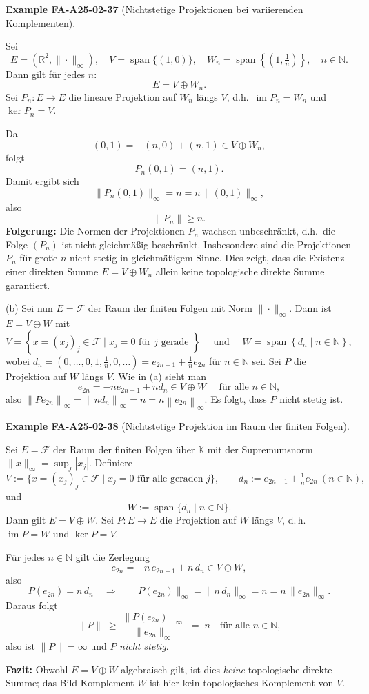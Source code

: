 \documentclass[10pt, letterpaper]{article}
\newcommand{\CustomHeading}[3]{%
  \par\medskip\noindent%
  \textbf{#1 #2} \textnormal{(#3)}.\enskip%
}
\newenvironment{EXA}[2]{\begin{unitbox}\CustomHeading{Example}{#1}{#2}}{\end{unitbox}}
\begin{document}
\begin{EXA}{FA-A25-02-37}{Nichtstetige Projektionen bei variierenden Komplementen}
Sei 
\[
E = (\mathbb{R}^2, \|\cdot\|_\infty), 
\quad V = \operatorname{span}\{(1,0)\},
\quad W_n = \operatorname{span}\!\left\{\left(1, \tfrac{1}{n}\right)\right\}, \quad n\in\mathbb{N}.
\]
Dann gilt für jedes $n$: 
\[
E = V \oplus W_n.
\]
Sei $P_n:E\to E$ die lineare Projektion auf $W_n$ längs $V$, d.h.\ $\operatorname{im}P_n=W_n$ und $\ker P_n=V$.

Da 
\[
(0,1) = -(n,0) + (n,1) \in V \oplus W_n,
\]
folgt 
\[
P_n(0,1) = (n,1).
\]
Damit ergibt sich
\[
\|P_n(0,1)\|_\infty = n = n\,\|(0,1)\|_\infty,
\]
also 
\[
\|P_n\| \ge n.
\]
\textbf{Folgerung:} Die Normen der Projektionen $P_n$ wachsen unbeschränkt, d.h.\ die Folge $(P_n)$ ist nicht gleichmäßig beschränkt. Insbesondere sind die Projektionen $P_n$ für große $n$ nicht stetig in gleichmäßigem Sinne. Dies zeigt, dass die Existenz einer direkten Summe $E = V \oplus W_n$ allein keine topologische direkte Summe garantiert.
\end{EXA}



(b) Sei nun $E=\mathcal{F}$ der Raum der finiten Folgen mit Norm $\|\cdot\|_{\infty}$. Dann ist $E=V \oplus W$ mit
$$
V=\left\{x=\left(x_{j}\right)_{j} \in \mathcal{F} \mid x_{j}=0 \text { für } j \text { gerade }\right\} \quad \text { und } \quad W=\operatorname{span}\left\{d_{n} \mid n \in \mathbb{N}\right\},
$$
wobei $d_{n}=\left(0, \ldots, 0,1, \frac{1}{n}, 0, \ldots\right)=e_{2 n-1}+\frac{1}{n} e_{2 n}$ für $n \in \mathbb{N}$ sei. Sei $P$ die Projektion auf $W$ längs $V$. Wie in (a) sieht man
$$
e_{2 n}=-n e_{2 n-1}+n d_{n} \in V \oplus W \quad \text { für alle } n \in \mathbb{N},
$$
also $\left\|P e_{2 n}\right\|_{\infty}=\left\|n d_{n}\right\|_{\infty}=n=n\left\|e_{2 n}\right\|_{\infty}$. Es folgt, dass $P$ nicht stetig ist.



\begin{EXA}{FA-A25-02-38}{Nichtstetige Projektion im Raum der finiten Folgen}
Sei $E=\mathcal{F}$ der Raum der finiten Folgen über $\mathbb{K}$ mit der Supremumsnorm 
$\|x\|_\infty=\sup_j |x_j|$. Definiere
\[
V:=\{x=(x_j)_j\in\mathcal{F}\mid x_j=0 \text{ für alle geraden } j\}, 
\qquad 
d_n:=e_{2n-1}+\tfrac{1}{n}e_{2n}\ (n\in\mathbb{N}),
\]
und
\[
W:=\operatorname{span}\{d_n\mid n\in\mathbb{N}\}.
\]
Dann gilt $E=V\oplus W$. Sei $P:E\to E$ die Projektion auf $W$ längs $V$, d.\,h.\ $\operatorname{im}P=W$ und $\ker P=V$.

Für jedes $n\in\mathbb{N}$ gilt die Zerlegung
\[
e_{2n}=-n\,e_{2n-1} + n\,d_n \in V\oplus W,
\]
also
\[
P(e_{2n}) = n\,d_n \quad\Longrightarrow\quad 
\|P(e_{2n})\|_\infty=\|n\,d_n\|_\infty = n = n\,\|e_{2n}\|_\infty.
\]
Daraus folgt
\[
\|P\|\;\ge\; \frac{\|P(e_{2n})\|_\infty}{\|e_{2n}\|_\infty} \;=\; n
\quad\text{für alle } n\in\mathbb{N},
\]
also ist $\|P\|=\infty$ und $P$ \emph{nicht stetig}.

\textbf{Fazit:} Obwohl $E=V\oplus W$ algebraisch gilt, ist dies \emph{keine} topologische direkte Summe; das Bild-Komplement $W$ ist hier kein topologisches Komplement von $V$.
\end{EXA}
\end{document}
